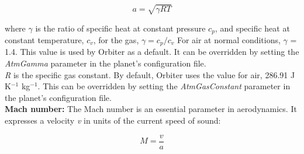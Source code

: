 \documentclass[Orbiter Developer Manual.tex]{subfiles}
\begin{document}
\[ a = \sqrt{\gamma RT} \]

\noindent
where $\gamma$ is the ratio of specific heat at constant pressure $c_{p}$, and specific heat at constant temperature, $c_{v}$, for the gas, $\gamma = c_{p} / c_{v}$ For air at normal conditions, $\gamma$ = 1.4. This value is used by Orbiter as a default. It can be overridden by setting the \textit{AtmGamma} parameter in the planet's configuration file.\\
\textit{R} is the specific gas constant. By default, Orbiter uses the value for air, 286.91 J K$^{-1}$ kg$^{-1}$. This can be overridden by setting the \textit{AtmGasConstant} parameter in the planet's configuration file.\\
\textbf{Mach number:} The Mach number is an essential parameter in aerodynamics. It expresses a velocity \textit{v} in units of the current speed of sound:

\[ M = \frac{v}{a} \]
\end{document}

